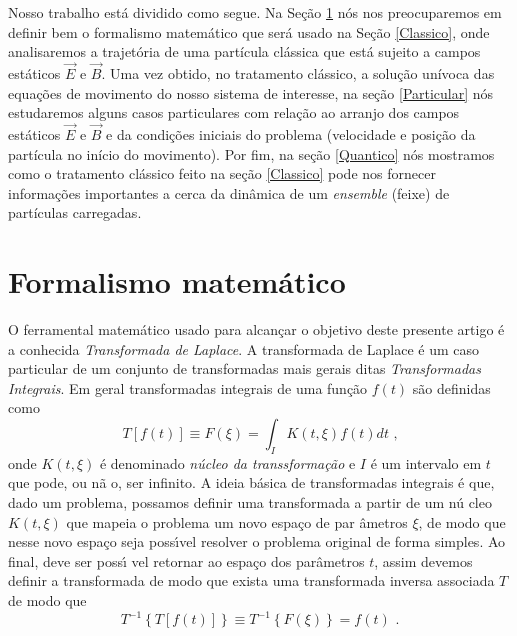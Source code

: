 \documentclass[twocolumn]{rbef}
\newcommand{\1}{\mathbbm{1}}
\begin{document}
Nosso trabalho está dividido como segue. Na Seção \ref{Laplace}
nós nos preocuparemos em definir bem o formalismo matemático que
será usado na Seção \ref{Classico}, onde analisaremos a
trajetória de uma partícula clássica que está sujeito a campos
estáticos $\vec{E}$ e $\vec{B}$. Uma vez obtido, no tratamento
clássico, a solução unívoca das equações de movimento do nosso
sistema de interesse, na seção \ref{Particular} nós estudaremos
alguns casos particulares com relação ao arranjo dos campos
estáticos $\vec{E}$ e $\vec{B}$ e da condições iniciais do
problema (velocidade e posição da partícula no início do
movimento). Por fim, na seção \ref{Quantico} nós mostramos como
o tratamento clássico feito na seção \ref{Classico} pode nos
fornecer informações importantes a cerca da dinâmica de um
\textit{ensemble} (feixe) de partículas carregadas.

\section{Formalismo matemático} \label{Laplace}

O ferramental matem\'{a}tico usado para alcan\c{c}ar o objetivo
deste presente artigo \'{e} a conhecida \textit{Transformada de
  Laplace}. A transformada de Laplace \'{e} um caso particular
de um conjunto de transformadas mais gerais ditas
\textit{Transformadas Integrais}. Em geral transformadas
integrais de uma fun\c{c}\~{a}o $f\left( t\right) $ s\~{a}o
definidas como \cite{Arfken}
\begin{equation}
  T\left[ f\left( t\right) \right] \equiv F\left( \xi \right) =\int_{I}K\left(
    t,\xi \right) f\left( t\right) dt \text{ ,}
\end{equation}%
onde $K\left( t,\xi \right) $ \'{e} denominado
\textit{n\'{u}cleo da transsforma\c{c}\~{a}o} e $I$ \'{e} um
intervalo em $t$ que pode, ou n\~{a}%
o, ser infinito. A ideia b\'{a}sica de transformadas integrais
\'{e} que, dado um problema, possamos definir uma transformada a
partir de um n\'{u}%
cleo $K\left( t,\xi \right) $ que mapeia o problema um novo
espa\c{c}o de par%
\^{a}metros $\xi $, de modo que nesse novo espa\c{c}o seja
poss\'{\i}vel resolver o problema original de forma simples. Ao
final, deve ser poss\'{\i}%
vel retornar ao espa\c{c}o dos par\^{a}metros $t$, assim devemos
definir a transformada de modo que exista uma transformada
inversa associada $T$ de modo que%
\[
  T^{-1}\left\{ T\left[ f\left( t\right) \right] \right\} \equiv
  T^{-1}\left\{ F\left( \xi \right) \right\} =f\left( t\right)
  \text{ .}
\]
\end{document}
